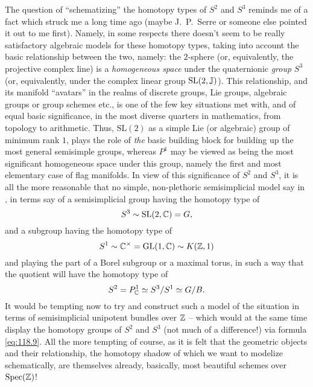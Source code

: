 The question of ``schematizing'' the homotopy types of $S^2$ and $S^3$
reminds me of a fact which struck me a long time ago (maybe
J.~P.~Serre or someone else pointed it out to me first). Namely, in
some respects there doesn't seem to be really satisfactory algebraic
models for these homotopy types, taking into account the basic
relationship between the two, namely: the $2$-sphere (or,
equivalently, the projective complex line) is a \emph{homogeneous
  space} under the quaternionic \emph{group} $S^3$ (or, equivalently,
under the complex linear group $\mathrm{SL}(2,{\mathbb{J}})$). This relationship, and its manifold
``avatars'' in the realms of discrete groups, Lie groups, algebraic
groups or group schemes etc., is one of the few key situations met
with, and of equal basic significance, in the most diverse quarters in
mathematics, from topology to arithmetic. Thus, $\mathrm{SL}(2)$ as a
simple Lie (or algebraic) group of minimum rank $1$, plays the role
of \emph{the} basic building block for building up the
most general semisimple groups, whereas $P^1$ may be viewed as being
the most significant homogeneous space under this group, namely the
first and most elementary case of flag manifolds. In view of this
significance of $S^2$ and $S^3$, it is all the more reasonable that no
simple, non-plethoric semisimplicial model say in
, in terms say of a semisimplicial group
having the homotopy type of
\[S^3 \sim \mathrm{SL}(2,{\mathbb{C}})=G,\]
and a subgroup having the homotopy type of
\[S^1 \sim {\ensuremath{\mathbb{C}}}^\times = \mathrm{GL}(1,{\mathbb{C}}) \sim K({\mathbb{Z}},1)\]
and playing the part of a Borel subgroup or a maximal torus, in such a
way that the quotient will have the homotopy type of
\[S^2= P^1_{\mathbb{C}} \simeq S^3/S^1 \simeq G/B.\]
It would be tempting now to try and construct such a model of the
situation in terms of semisimplicial unipotent bundles over ${\mathbb{Z}}$ --
which would at the same time display the homotopy groups of $S^2$ and
$S^3$ (not much of a difference!) via formula \eqref{eq:118.9}. All
the more tempting of course, as it is felt that the geometric objects
and their relationship, the homotopy shadow of which we want to
modelize schematically, are themselves already, basically, most
beautiful schemes over $\operatorname{Spec}({\mathbb{Z}})$!

